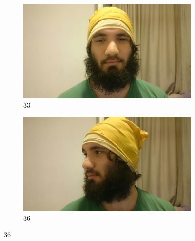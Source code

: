 \documentclass[conference,compsoc]{IEEEtran}
\begin{document}
\begin{figure}[h!]
  \centering
  \begin{subfigure}[b]{0.4\linewidth}
    \includegraphics[width=\linewidth]{55.jpeg}
    \caption{33}
  \end{subfigure}
  \begin{subfigure}[b]{0.4\linewidth}
    \includegraphics[width=\linewidth]{66.jpeg}
    \caption{36}
  \end{subfigure}

\end{figure}
\end{document}

